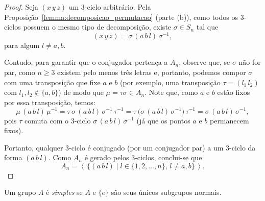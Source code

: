 \documentclass[11pt,openany]{book}
\newenvironment{novo}{
    \color{red}
}{}
\begin{document}
\begin{novo}
\begin{proof}
Seja \((x\,y\,z)\) um \(3\)-ciclo arbitrário. Pela Proposição~\ref{lemma:decomposicao_permutacao} (parte (b)), como todos os \(3\)-ciclos possuem o mesmo tipo de decomposição, existe \(\sigma\in S_n\) tal que
\[
(x\,y\,z)=\sigma\,(a\,b\,l)\,\sigma^{-1},
\]
para algum \(l\neq a,b\). 

Contudo, para garantir que o conjugador pertença a \(A_n\), observe que, se \(\sigma\) não for par, como \(n\ge3\) existem pelo menos três letras e, portanto, podemos compor \(\sigma\) com uma transposição que fixe \(a\) e \(b\) (por exemplo, uma transposição \(\tau=(l_1\,l_2)\) com \(l_1,l_2\notin\{a,b\}\)) de modo que \(\mu=\tau\sigma\in A_n\). Note que, como \(a\) e \(b\) estão fixos por essa transposição, temos:
\[
\mu\,(a\,b\,l)\,\mu^{-1} = \tau\,\sigma\,(a\,b\,l)\,\sigma^{-1}\,\tau^{-1} = \tau\,\bigl(\sigma\,(a\,b\,l)\,\sigma^{-1}\bigr)\,\tau^{-1} = \sigma\,(a\,b\,l)\,\sigma^{-1},
\]
pois \(\tau\) comuta com o \(3\)-ciclo \(\sigma\,(a\,b\,l)\,\sigma^{-1}\) (já que os pontos \(a\) e \(b\) permanecem fixos).

Portanto, qualquer \(3\)-ciclo é conjugado (por um conjugador par) a um \(3\)-ciclo da forma \((a\,b\,l)\). Como \(A_n\) é gerado pelos \(3\)-ciclos, conclui-se que
\[
A_n = \left\langle\,\{ (a\,b\,l) \mid l\in\{1,2,\dots,n\},\,l\neq a,b \}\,\right\rangle.
\]
\end{proof}
\end{novo}

\begin{definition}
\label{def:grupo_simples}
    Um grupo $A$ é \textit{simples} se $A$ e $\{e\}$ são seus únicos subgrupos normais.
\end{definition}
\end{document}
